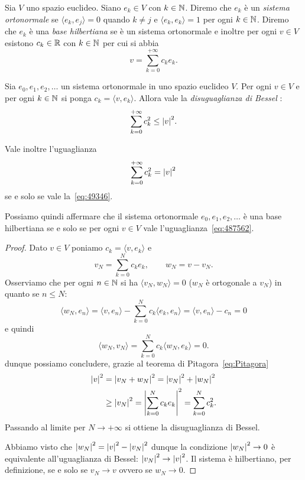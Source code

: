 \begin{definition}
Sia $V$ uno spazio euclideo. Siano $e_k\in V$ con $k\in {\mathbb N}$. Diremo che
$e_k$ è un \emph{sistema ortonormale}%
 se $\langle e_k, e_j\rangle = 0$ quando
$k\neq j$ e $\langle e_k, e_k\rangle = 1$ per ogni $k\in {\mathbb N}$.
Diremo che $e_k$ è una \emph{base hilbertiana}%
 se è un sistema ortonormale
e inoltre per ogni $v\in V$
esistono $c_k\in {\mathbb R}$ con $k\in{\mathbb N}$ per cui si abbia
\begin{equation}\label{eq:49346}
  v = \sum_{k=0}^{+\infty} c_k e_k.
\end{equation}
\end{definition}

\begin{theorem}
\label{th:bessel}%
Sia $e_0, e_1, e_2, \dots$ un sistema ortonormale in uno spazio euclideo $V$.
Per ogni $v\in V$ e per ogni $k\in {\mathbb N}$ si ponga $c_k = \langle v,e_k\rangle$.
Allora vale la
\emph{disuguaglianza di Bessel}%
:
\begin{equation}\label{eq:disuguaglianza_Bessel}
\sum_{k=0}^{+\infty} c_k^2 \le {\left|v\right|}^2.
\end{equation}

Vale inoltre l'uguaglianza
\begin{equation}\label{eq:487562}
\sum_{k=0}^{+\infty} c_k^2 = {\left|v\right|}^2
\end{equation}
se e solo se vale la~\eqref{eq:49346}.

Possiamo quindi affermare che il sistema ortonormale $e_0, e_1, e_2, \dots$
è una base hilbertiana se e solo se per ogni $v\in V$ vale l'uguaglianza~\eqref{eq:487562}.
\end{theorem}
%
\begin{proof}
Dato $v\in V$ poniamo $c_k = \langle v,e_k\rangle$ e
\[
   v_N = \sum_{k=0}^N c_k e_k, \qquad w_N = v - v_N.
\]
Osserviamo che per ogni $n\in {\mathbb N}$ si ha $\langle v_N,w_N\rangle=0$
($w_N$ è ortogonale a $v_N$)
in quanto se $n\le N$:
\[
  \langle w_N , e_n \rangle
  = \langle v, e_n\rangle - \sum_{k=0}^N c_k \langle e_k, e_n\rangle
  = \langle v,e_n\rangle - c_n = 0
\]
e quindi
\[
 \langle w_N, v_N \rangle = \sum_{k=0}^N c_k \langle w_N, e_k\rangle = 0.
\]
dunque possiamo concludere, grazie al teorema di Pitagora~\eqref{eq:Pitagora}
\begin{align*}
  {\left|v\right|}^2
  &= {\left|v_N + w_N\right|}^2
  = {\left|v_N\right|}^2 + {\left|w_N\right|}^2 \\
  &\ge {\left|v_N\right|}^2 = {\left|\sum_{k=0}^N c_k e_k\right|}^2
  = \sum_{k=0}^N c_k^2.
\end{align*}
Passando al limite per $N\to +\infty$ si ottiene la disuguaglianza
di Bessel.

Abbiamo visto che ${\left|w_N\right|}^2 = {\left|v\right|}^2 - {\left|v_N\right|}^2$
dunque la condizione ${\left|w_N\right|}^2\to 0$ è equivalente
all'uguaglianza di Bessel: ${\left|v_N\right|}^2 \to {\left|v\right|}^2$.
Il sistema è hilbertiano, per definizione, se e solo se $v_N \to v$
ovvero se $w_N\to 0$.
\end{proof}

